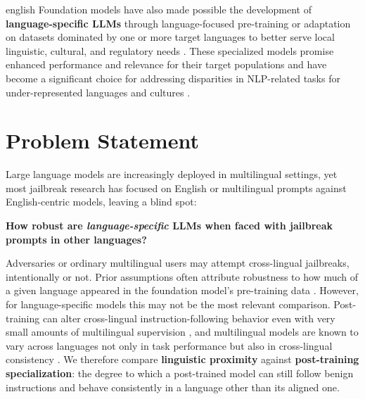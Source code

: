 \begin{otherlanguage*}{english}
Foundation models have also made possible the development of \textbf{language-specific LLMs} through language-focused pre-training or adaptation on datasets dominated by one or more target languages to better serve local linguistic, cultural, and regulatory needs \cite{bacciuFaunoItalianLarge2023, OliveiraJLT2024Sagui7BInstruct01, alexandrovBgGPT10Extending2024, ekgren-etal-2024-gpt}. These specialized models promise enhanced performance and relevance for their target populations and have become a significant choice for addressing disparities in NLP-related tasks for under-represented languages and cultures \cite{blasiSystematicInequalitiesLanguage2021, laiChatGPTEnglishComprehensive2023}.


\section{Problem Statement}
Large language models are increasingly deployed in multilingual settings, yet most jailbreak research has focused on English or multilingual prompts against English-centric models, leaving a blind spot:

	\textbf{How robust are \emph{language-specific} LLMs when faced with jailbreak prompts in other languages?}

Adversaries or ordinary multilingual users may attempt cross-lingual jailbreaks, intentionally or not. Prior assumptions often attribute robustness to how much of a given language appeared in the foundation model's pre-training data \cite{shenLanguageBarrierDissecting2024}. However, for language-specific models this may not be the most relevant comparison. Post-training can alter cross-lingual instruction-following behavior even with very small amounts of multilingual supervision \cite{shaham2024multilingual}, and multilingual models are known to vary across languages not only in task performance but also in cross-lingual consistency \cite{hu2020xtreme,qi2023crosslingual,xing2024inconsistency}. We therefore compare \textbf{linguistic proximity} against \textbf{post-training specialization}: the degree to which a post-trained model can still follow benign instructions and behave consistently in a language other than its aligned one.


\end{otherlanguage*}
